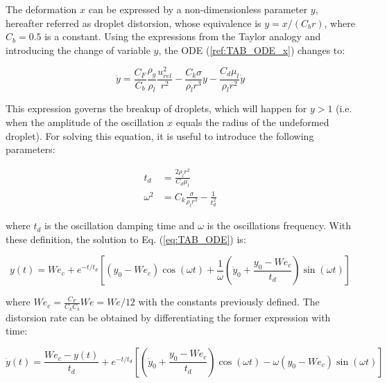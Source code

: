 The deformation $x$ can be expressed by a non-dimensionless parameter $y$, hereafter referred as droplet distorsion, whose equivalence is $y = x / \left( C_b r \right)$, where $C_b = 0.5$ is a constant. Using the expressions from the Taylor analogy and introducing the change of variable $y$, the ODE (\ref{ref:TAB_ODE_x}) changes to:

\begin{equation}
\label{eq:TAB_ODE}
\ddot{y} = \frac{C_F}{C_b} \frac{\rho_g}{\rho_l} \frac{u_{rel}^2}{r^2} - \frac{C_k \sigma}{\rho_l r^3} y - \frac{C_d \mu_l}{\rho_l r^2} \dot{y}
\end{equation}

This expression governs the breakup of droplets, which will happen for $y > 1$ (i.e. when the amplitude of the oscillation $x$ equals the radius of the undeformed droplet). For solving this equation, it is useful to introduce the following parameters:

\begin{subequations}
\label{eq:TAB_td_omega_definition}
\begin{align}
t_d &= \frac{2 \rho_l r^2}{C_d \mu_l} \\
\omega^2 &= C_k \frac{\sigma}{\rho_l r^3} - \frac{1}{t_d^2}
\end{align}
\end{subequations}

where $t_d$ is the oscillation damping time and $\omega$ is the oscillations frequency. With these definition, the solution to Eq. (\ref{eq:TAB_ODE}) is:

\begin{equation}
\label{eq:yTAB_equation_general}
y \left( t \right) = We_c + e^{- t / t_d} \left[ \left( y_0 - We_c \right) \cos \left( \omega t \right) + \frac{1}{\omega}\left( \dot{y}_0 + \frac{y_0 - We_c}{t_d} \right) \sin \left( \omega t \right)   \right]
\end{equation}

where $We_c = \frac{C_F}{C_k C_b} We = We / 12$ with the constants previously defined. The distorsion rate can be obtained by differentiating the former expression with time:

\begin{equation}
\label{eq:dydtTAB_equation_general}
\dot{y} \left( t \right) = \frac{We_c - y \left( t \right) }{t_d} + e^{- t / t_d} \left[ \left( \dot{y}_0 + \frac{y_0 - We_c}{t_d} \right) \cos \left( \omega t \right) - \omega \left( y_0 - We_c \right) \sin \left( \omega t \right)  \right]
\end{equation}

